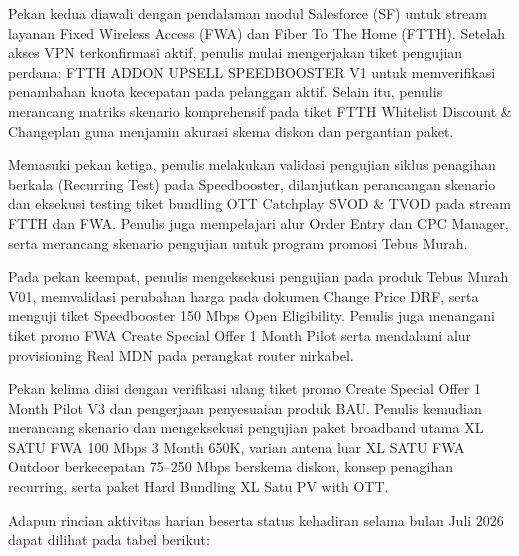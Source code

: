 \documentclass[12pt,a4paper]{article}
\begin{document}
Pekan kedua diawali dengan pendalaman modul Salesforce (SF) untuk stream layanan Fixed Wireless Access (FWA) dan Fiber To The Home (FTTH). Setelah akses VPN terkonfirmasi aktif, penulis mulai mengerjakan tiket pengujian perdana: FTTH ADDON UPSELL SPEEDBOOSTER V1 untuk memverifikasi penambahan kuota kecepatan pada pelanggan aktif. Selain itu, penulis merancang matriks skenario komprehensif pada tiket FTTH Whitelist Discount \& Changeplan guna menjamin akurasi skema diskon dan pergantian paket.

Memasuki pekan ketiga, penulis melakukan validasi pengujian siklus penagihan berkala (Recurring Test) pada Speedbooster, dilanjutkan perancangan skenario dan eksekusi testing tiket bundling OTT Catchplay SVOD \& TVOD pada stream FTTH dan FWA. Penulis juga mempelajari alur Order Entry dan CPC Manager, serta merancang skenario pengujian untuk program promosi Tebus Murah.

Pada pekan keempat, penulis mengeksekusi pengujian pada produk Tebus Murah V01, memvalidasi perubahan harga pada dokumen Change Price DRF, serta menguji tiket Speedbooster 150 Mbps Open Eligibility. Penulis juga menangani tiket promo FWA Create Special Offer 1 Month Pilot serta mendalami alur provisioning Real MDN pada perangkat router nirkabel.

Pekan kelima diisi dengan verifikasi ulang tiket promo Create Special Offer 1 Month Pilot V3 dan pengerjaan penyesuaian produk BAU. Penulis kemudian merancang skenario dan mengeksekusi pengujian paket broadband utama XL SATU FWA 100 Mbps 3 Month 650K, varian antena luar XL SATU FWA Outdoor berkecepatan 75--250 Mbps berskema diskon, konsep penagihan recurring, serta paket Hard Bundling XL Satu PV with OTT.

\vspace{0.4cm}
\noindent Adapun rincian aktivitas harian beserta status kehadiran selama bulan Juli 2026 dapat dilihat pada tabel berikut:
\end{document}
